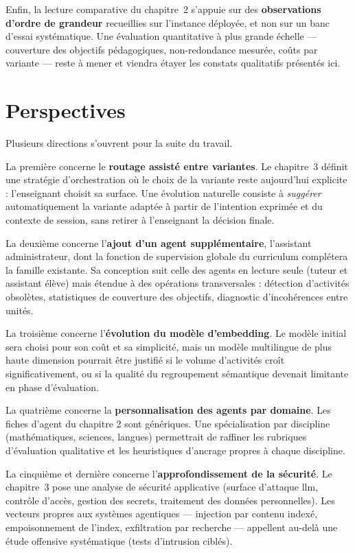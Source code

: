 Enfin, la lecture comparative du chapitre~2 s'appuie sur des
\textbf{observations d'ordre de grandeur} recueillies sur
l'instance déployée, et non sur un banc d'essai systématique. Une
évaluation quantitative à plus grande échelle — couverture des
objectifs pédagogiques, non-redondance mesurée, coûts par
variante — reste à mener et viendra étayer les constats
qualitatifs présentés ici.

\section*{Perspectives}

Plusieurs directions s'ouvrent pour la suite du travail.

La première concerne le \textbf{routage assisté entre variantes}.
Le chapitre~3 définit une stratégie d'orchestration où le choix de
la variante reste aujourd'hui explicite : l'enseignant choisit sa
surface. Une évolution naturelle consiste à \emph{suggérer}
automatiquement la variante adaptée à partir de l'intention
exprimée et du contexte de session, sans retirer à l'enseignant la
décision finale.

La deuxième concerne l'\textbf{ajout d'un agent supplémentaire},
l'assistant administrateur, dont la fonction de supervision
globale du curriculum complétera la famille existante. Sa
conception suit celle des agents en lecture seule (tuteur et
assistant élève) mais étendue à des opérations transversales :
détection d'activités obsolètes, statistiques de couverture des
objectifs, diagnostic d'incohérences entre unités.

La troisième concerne l'\textbf{évolution du modèle
d'embedding}. Le modèle initial sera choisi pour son coût et sa
simplicité, mais un modèle multilingue de plus haute dimension
pourrait être justifié si le volume d'activités croît
significativement, ou si la qualité du regroupement sémantique
devenait limitante en phase d'évaluation.

La quatrième concerne la \textbf{personnalisation des agents par
domaine}. Les fiches d'agent du chapitre 2 sont génériques. Une
spécialisation par discipline (mathématiques, sciences, langues)
permettrait de raffiner les rubriques d'évaluation qualitative
et les heuristiques d'ancrage propres à chaque discipline.

La cinquième et dernière concerne l'\textbf{approfondissement de
la sécurité}. Le chapitre~3 pose une analyse de sécurité
applicative (surface d'attaque \gls{llm}, contrôle d'accès,
gestion des secrets, traitement des données personnelles).
Les vecteurs propres aux systèmes agentiques — injection par
contenu indexé, empoisonnement de l'index, exfiltration par
recherche — appellent au-delà une étude offensive systématique
(tests d'intrusion ciblés).

